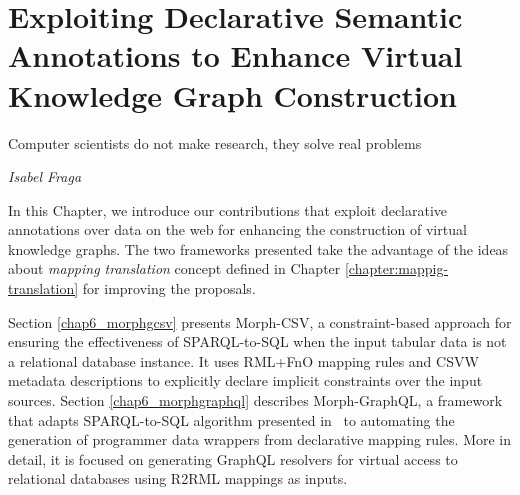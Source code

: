 
\chapter{Exploiting Declarative Semantic Annotations to Enhance Virtual Knowledge Graph Construction}
\label{chapter:virtual}
\epigraph{Computer scientists do not make research, they solve real problems}{\textit{Isabel Fraga}}

In this Chapter, we introduce our contributions that exploit declarative annotations over data on the web for enhancing the construction of virtual knowledge graphs. The two frameworks presented take the advantage of the ideas about \textit{mapping translation} concept defined in Chapter \ref{chapter:mappig-translation} for improving the proposals. 

Section \ref{chap6_morphgcsv} presents Morph-CSV, a constraint-based approach for ensuring the effectiveness of SPARQL-to-SQL when the input tabular data is not a relational database instance. It uses RML+FnO mapping rules and CSVW metadata descriptions to explicitly declare implicit constraints over the input sources. Section \ref{chap6_morphgraphql} describes Morph-GraphQL, a framework that adapts SPARQL-to-SQL algorithm presented in~\citep{chebotko2009semantics} to automating the generation of programmer data wrappers from declarative mapping rules. More in detail, it is focused on generating GraphQL resolvers for virtual access to relational databases using R2RML mappings as inputs.



